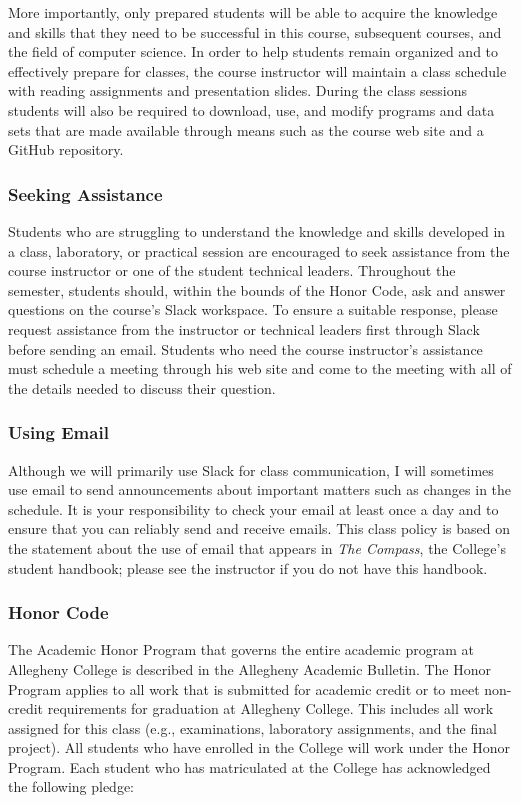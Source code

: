 \documentclass[11pt]{article}
\newcommand{\instructorpronoun}[1]{his}
\begin{document}
More importantly, only prepared students will be able to acquire the knowledge
and skills that they need to be successful in this course, subsequent courses,
and the field of computer science. In order to help students remain organized
and to effectively prepare for classes, the course instructor will maintain a
class schedule with reading assignments and presentation slides. During the
class sessions students will also be required to download, use, and modify
programs and data sets that are made available through means such as the course
web site and a GitHub repository.

\subsubsection*{Seeking Assistance}

Students who are struggling to understand the knowledge and skills developed in
a class, laboratory, or practical session are encouraged to seek assistance from
the course instructor or one of the student technical leaders. Throughout the
semester, students should, within the bounds of the Honor Code, ask and answer
questions on the course's Slack workspace. To ensure a suitable response, please
request assistance from the instructor or technical leaders first through Slack
before sending an email. Students who need the course instructor's assistance
must schedule a meeting through \instructorpronoun{} web site and come to the
meeting with all of the details needed to discuss their question.

\subsubsection*{Using Email}

Although we will primarily use Slack for class communication, I will sometimes
use email to send announcements about important matters such as changes in the
schedule. It is your responsibility to check your email at least once a day and
to ensure that you can reliably send and receive emails. This class policy is
based on the statement about the use of email that appears in {\em The Compass},
the College's student handbook; please see the instructor if you do not have
this handbook.

\subsubsection*{Honor Code}

The Academic Honor Program that governs the entire academic program at Allegheny College is described in the Allegheny
Academic Bulletin. The Honor Program applies to all work that is submitted for academic credit or to meet non-credit
requirements for graduation at Allegheny College. This includes all work assigned for this class (e.g., examinations,
laboratory assignments, and the final project). All students who have enrolled in the College will work under the Honor
Program. Each student who has matriculated at the College has acknowledged the following pledge:
\end{document}
